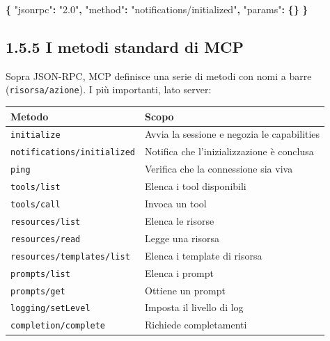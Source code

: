 \documentclass[
  italian,
  10pt,
]{book}
\newenvironment{Shaded}{\begin{snugshade}}{\end{snugshade}}
\newcommand{\DataTypeTok}[1]{\textcolor[rgb]{0.13,0.29,0.53}{#1}}
\newcommand{\FunctionTok}[1]{\textcolor[rgb]{0.13,0.29,0.53}{\textbf{#1}}}
\newcommand{\StringTok}[1]{\textcolor[rgb]{0.31,0.60,0.02}{#1}}
\newcounter{none} %
\begin{document}
\begin{Shaded}
\begin{Highlighting}[]
\FunctionTok{\{}
  \DataTypeTok{"jsonrpc"}\FunctionTok{:} \StringTok{"2.0"}\FunctionTok{,}
  \DataTypeTok{"method"}\FunctionTok{:} \StringTok{"notifications/initialized"}\FunctionTok{,}
  \DataTypeTok{"params"}\FunctionTok{:} \FunctionTok{\{\}}
\FunctionTok{\}}
\end{Highlighting}
\end{Shaded}

\subsection{1.5.5 I metodi standard di
MCP}\label{i-metodi-standard-di-mcp}

Sopra JSON-RPC, MCP definisce una serie di metodi con nomi a barre
(\texttt{risorsa/azione}). I più importanti, lato server:

{\def\LTcaptype{none} %
\begin{longtable}[]{@{}
  >{\raggedright\arraybackslash}p{}
  >{\raggedright\arraybackslash}p{}@{}}
\toprule\noalign{}
\begin{minipage}[b]{\linewidth}\raggedright
Metodo
\end{minipage} & \begin{minipage}[b]{\linewidth}\raggedright
Scopo
\end{minipage} \\
\midrule\noalign{}
\endhead
\bottomrule\noalign{}
\endlastfoot
\texttt{initialize} & Avvia la sessione e negozia le capabilities \\
\texttt{notifications/initialized} & Notifica che l'inizializzazione è
conclusa \\
\texttt{ping} & Verifica che la connessione sia viva \\
\texttt{tools/list} & Elenca i tool disponibili \\
\texttt{tools/call} & Invoca un tool \\
\texttt{resources/list} & Elenca le risorse \\
\texttt{resources/read} & Legge una risorsa \\
\texttt{resources/templates/list} & Elenca i template di risorsa \\
\texttt{prompts/list} & Elenca i prompt \\
\texttt{prompts/get} & Ottiene un prompt \\
\texttt{logging/setLevel} & Imposta il livello di log \\
\texttt{completion/complete} & Richiede completamenti \\
\end{longtable}
}
\end{document}
